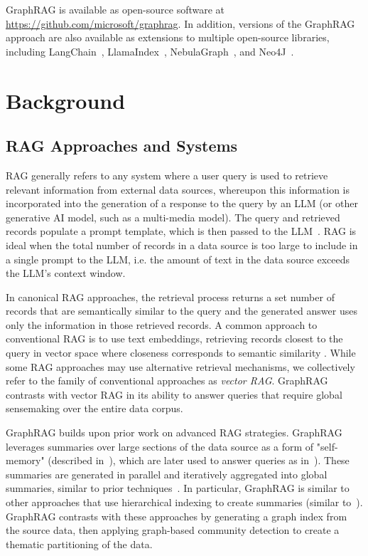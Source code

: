 \documentclass{article}
\begin{document}
GraphRAG is available as open-source software at \url{https://github.com/microsoft/graphrag}.
In addition, versions of the GraphRAG approach are also available as extensions to multiple open-source libraries, including LangChain~\citep{LangchainGraphRAG}, LlamaIndex~\citep{LlamaIndexGraphRAG}, NebulaGraph~\citep{NebulaGraph}, and Neo4J~\citep{Neo4jGraphRAG}.

\section{Background}

\subsection{RAG Approaches and Systems}

RAG generally refers to any system where a user query is used to retrieve relevant information from external data sources, whereupon this information is incorporated into the generation of a response to the query by an LLM (or other generative AI model, such as a multi-media model).
The query and retrieved records populate a prompt template, which is then passed to the LLM~\citep{ram2023context}.
RAG is ideal when the total number of records in a data source is too large to include in a single prompt to the LLM, i.e. the amount of text in the data source exceeds the LLM's context window.   

In canonical RAG approaches, the retrieval process returns a set number of records that are semantically similar to the query and the generated answer uses only the information in those retrieved records.
A common approach to conventional RAG is to use text embeddings, retrieving records closest to the query in vector space where closeness corresponds to semantic similarity \citep{gao2023retrieval}.
While some RAG approaches may use alternative retrieval mechanisms, we collectively refer to the family of conventional approaches as \emph{vector RAG}.
GraphRAG contrasts with vector RAG in its ability to answer queries that require global sensemaking over the entire data corpus.

GraphRAG builds upon prior work on advanced RAG strategies.
GraphRAG leverages summaries over large sections of the data source as a form of "self-memory" (described in~\citealt{cheng2024lift}), which are later used to answer queries as in~\citealt{mao2020generation}). These summaries are generated in parallel and iteratively aggregated into global summaries, similar to prior techniques~\citep{shao2023enhancing, wang2024feb4rag, su2020caire, feng2023retrieval, trivedi2022interleaving, khattab2022demonstrate, gao2023retrieval}.
In particular, GraphRAG is similar to other approaches that use hierarchical indexing to create summaries (similar to~\citealt{kim2023tree, sarthi2024raptor}).
GraphRAG contrasts with these approaches by generating a graph index from the source data, then applying graph-based community detection to create a thematic partitioning of the data. 
\end{document}
